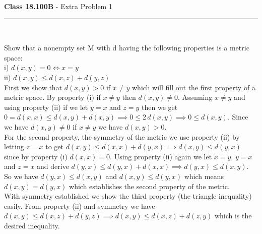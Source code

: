 \documentclass[11pt,reqno]{article}
\begin{document}

\vspace{15pt}
\begin{flushleft} 
\textbf{Class 18.100B} - Extra Problem 1\\
\rule{500pt}{1pt}\\
\end{flushleft} 
Show that a nonempty set M with d having the following properties is a metric space: \\
i) $d(x,y) = 0 \iff x = y$\\
ii) $d(x,y) \le d(x,z) + d(y,z)$ \\ \newline
\indent First we show that $d(x,y) > 0$ if $x \neq y$ which will fill out the first property of a metric space. By property (i) if $x \neq y$ then $d(x,y) \neq 0$. Assuming $x \neq y$ and using property (ii) if we let $y = x$ and $z = y$ then we get $0 = d(x,x) \le d(x,y) + d(x, y) \implies 0 \le 2 \,d(x,y) \implies 0 \le d(x,y)$. Since we have $d(x,y) \neq 0$ if $x \neq y$ we have $d(x,y) > 0$.\\
\indent For the second property, the symmetry of the metric we use property (ii) by letting $z = x$ to get $d(x,y) \le d(x,x) + d(y,x) \implies d(x,y) \le d(y,x)$ since by property (i) $d(x,x) = 0$. Using property (ii) again we let $x = y$, $y = x$ and $z = x$ and derive $d(y,x) \le d(y,x) + d(x,x) \implies d(y,x) \le d(x,y)$. So we have $d(y,x) \le d(x,y)$ and $d(x,y) \le d(y,x)$ which means $d(x,y) = d(y,x)$ which establishes the second property of the metric.\\
\indent With symmetry established we show the third property (the triangle inequality) easily. From property (ii) and symmetry we have $d(x,y) \le d(x,z) + d(y,z) \implies d(x,y) \le d(x,z) + d(z,y)$ which is the desired inequality.
\end{document}
